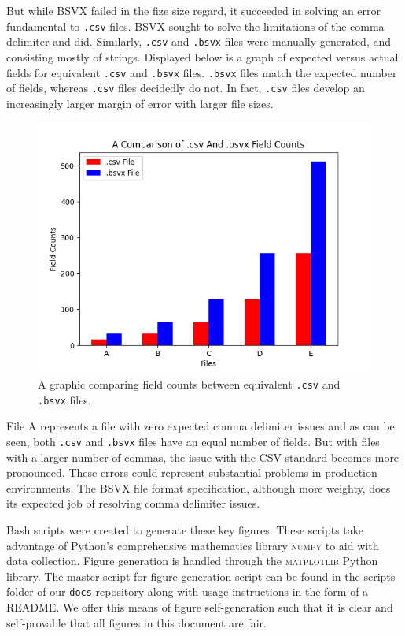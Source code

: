 \documentclass[10pt]{article}
\begin{document}
\indent{}
But while BSVX failed in the fize size regard, it succeeded in solving an error fundamental to \texttt{.csv} files.
BSVX sought to solve the limitations of the comma delimiter and did.
Similarly, \texttt{.csv} and \texttt{.bsvx} files were manually generated, and consisting mostly of strings.
Displayed below is a graph of expected versus actual fields for equivalent \texttt{.csv} and \texttt{.bsvx} files.
\texttt{.bsvx} files match the expected number of fields, whereas \texttt{.csv} files decidedly do not.
In fact, \texttt{.csv} files develop an increasingly larger margin of error with larger file sizes.

\begin{figure}[H]
\centering
\includegraphics[width=5in]{scripts/figures/2.png}
\caption{A graphic comparing field counts between equivalent \texttt{.csv} and \texttt{.bsvx} files.}
\label{fig:results_2}
\end{figure}

\indent{}
File A represents a file with zero expected comma delimiter issues and as can be seen, both \texttt{.csv} and \texttt{.bsvx} files have an equal number of fields.
But with files with a larger number of commas, the issue with the CSV standard becomes more pronounced.
These errors could represent substantial problems in production environments.
The BSVX file format specification, although more weighty, does its expected job of resolving comma delimiter issues.

\indent{}
Bash scripts were created to generate these key figures.
These scripts take advantage of Python's comprehensive mathematics library \textsc{numpy} to aid with data collection.
Figure generation is handled through the \textsc{matplotlib} Python library.
The master script for figure generation script can be found in the scripts folder of our \href{https://github.com/bsvx/docs}{\texttt{docs} repository} along with usage instructions in the form of a README.
We offer this means of figure self-generation such that it is clear and self-provable that all figures in this document are fair.
\end{document}
